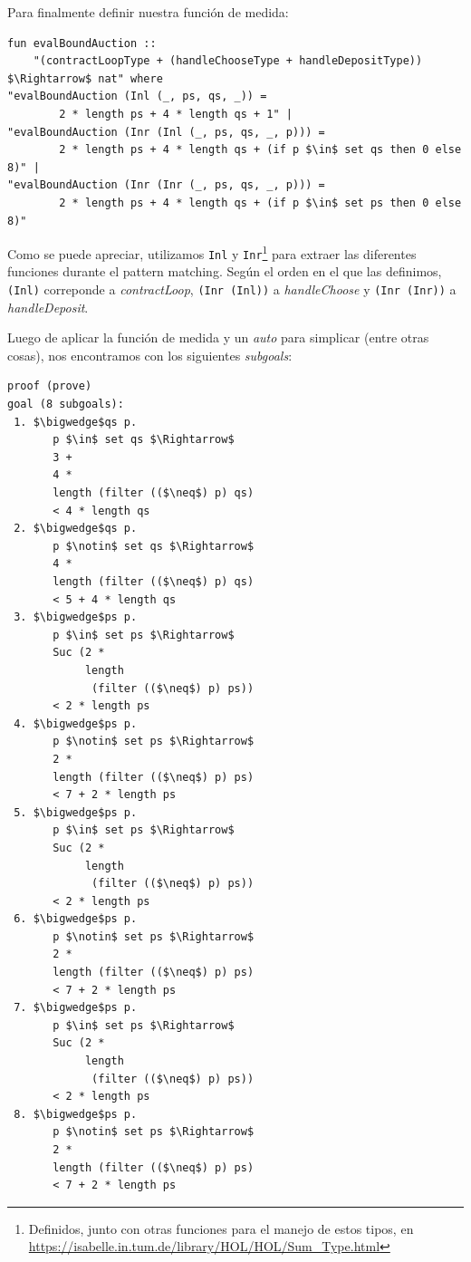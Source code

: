 \documentclass[12pt]{book}
\begin{document}
Para finalmente definir nuestra función de medida:

\newpage
\begin{lstlisting}[style=Isabelle, caption=Función que será utilizada por \textit{measure} para probar la terminación del contrato \textit{Auction}., label={lst:evalBoundAuction}]
fun evalBoundAuction :: 
    "(contractLoopType + (handleChooseType + handleDepositType)) $\Rightarrow$ nat" where
"evalBoundAuction (Inl (_, ps, qs, _)) =
        2 * length ps + 4 * length qs + 1" |
"evalBoundAuction (Inr (Inl (_, ps, qs, _, p))) =
        2 * length ps + 4 * length qs + (if p $\in$ set qs then 0 else 8)" |
"evalBoundAuction (Inr (Inr (_, ps, qs, _, p))) =
        2 * length ps + 4 * length qs + (if p $\in$ set ps then 0 else 8)"
\end{lstlisting}

Como se puede apreciar, utilizamos \texttt{Inl} y \texttt{Inr}\footnote{Definidos, junto con otras funciones para el manejo de estos tipos, en \url{https://isabelle.in.tum.de/library/HOL/HOL/Sum_Type.html}} para extraer las diferentes funciones durante el pattern matching. Según el orden en el que las definimos, \texttt{(Inl)} correponde a \textit{contractLoop}, \texttt{(Inr (Inl))} a \textit{handleChoose} y \texttt{(Inr (Inr))} a \textit{handleDeposit}.

Luego de aplicar la función de medida y un \textit{auto} para simplicar (entre otras cosas), nos encontramos con los siguientes \textit{subgoals}:

\newpage
\begin{lstlisting}[style=Isabelle]
proof (prove)
goal (8 subgoals):
 1. $\bigwedge$qs p.
       p $\in$ set qs $\Rightarrow$
       3 +
       4 *
       length (filter (($\neq$) p) qs)
       < 4 * length qs
 2. $\bigwedge$qs p.
       p $\notin$ set qs $\Rightarrow$
       4 *
       length (filter (($\neq$) p) qs)
       < 5 + 4 * length qs
 3. $\bigwedge$ps p.
       p $\in$ set ps $\Rightarrow$
       Suc (2 *
            length
             (filter (($\neq$) p) ps))
       < 2 * length ps
 4. $\bigwedge$ps p.
       p $\notin$ set ps $\Rightarrow$
       2 *
       length (filter (($\neq$) p) ps)
       < 7 + 2 * length ps
 5. $\bigwedge$ps p.
       p $\in$ set ps $\Rightarrow$
       Suc (2 *
            length
             (filter (($\neq$) p) ps))
       < 2 * length ps
 6. $\bigwedge$ps p.
       p $\notin$ set ps $\Rightarrow$
       2 *
       length (filter (($\neq$) p) ps)
       < 7 + 2 * length ps
 7. $\bigwedge$ps p.
       p $\in$ set ps $\Rightarrow$
       Suc (2 *
            length
             (filter (($\neq$) p) ps))
       < 2 * length ps
 8. $\bigwedge$ps p.
       p $\notin$ set ps $\Rightarrow$
       2 *
       length (filter (($\neq$) p) ps)
       < 7 + 2 * length ps
\end{lstlisting}
\end{document}

